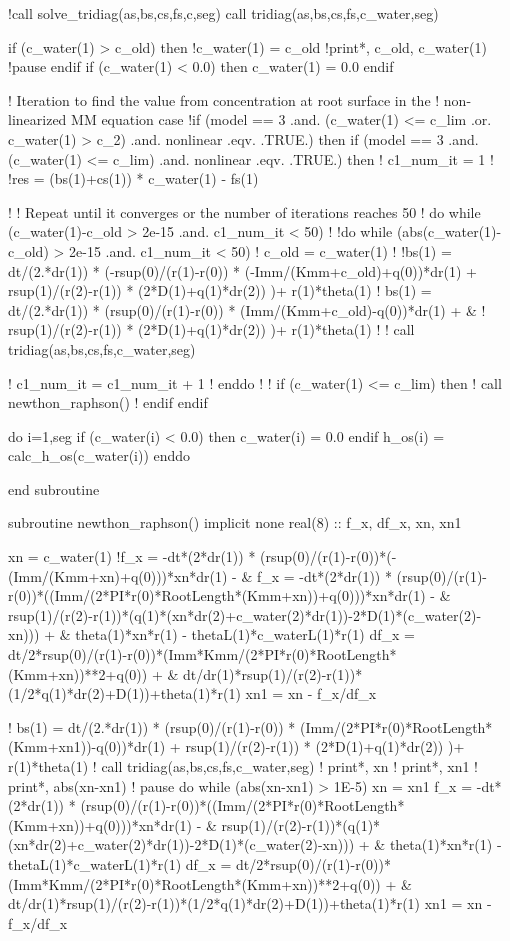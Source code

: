   !call solve_tridiag(as,bs,cs,fs,c,seg)
  call tridiag(as,bs,cs,fs,c_water,seg)
  
  if (c_water(1) > c_old) then
    !c_water(1) = c_old
    !print*, c_old, c_water(1)
    !pause
  endif
  if (c_water(1) < 0.0) then
    c_water(1) = 0.0
  endif

  ! Iteration to find the value from concentration at root surface in the
  ! non-linearized MM equation case
  !if (model == 3 .and. (c_water(1) <= c_lim .or. c_water(1) > c_2) .and. nonlinear .eqv. .TRUE.) then
  if (model == 3 .and. (c_water(1) <= c_lim) .and. nonlinear .eqv. .TRUE.) then
  !  c1_num_it = 1
  !  !res = (bs(1)+cs(1)) * c_water(1) - fs(1)

  !  ! Repeat until it converges or the number of iterations reaches 50
  !  do while (c_water(1)-c_old > 2e-15 .and. c1_num_it < 50) 
  !  !do while (abs(c_water(1)-c_old) > 2e-15 .and. c1_num_it < 50) 
  !    c_old = c_water(1)
  !    !bs(1) = dt/(2.*dr(1)) * (-rsup(0)/(r(1)-r(0)) * (-Imm/(Kmm+c_old)+q(0))*dr(1) + rsup(1)/(r(2)-r(1)) * (2*D(1)+q(1)*dr(2)) )+ r(1)*theta(1)
  !    bs(1) = dt/(2.*dr(1)) * (rsup(0)/(r(1)-r(0)) * (Imm/(Kmm+c_old)-q(0))*dr(1) + &
  !            rsup(1)/(r(2)-r(1)) * (2*D(1)+q(1)*dr(2)) )+ r(1)*theta(1) 
  !    
  !    call tridiag(as,bs,cs,fs,c_water,seg)

  !    c1_num_it = c1_num_it + 1
  !  enddo
  ! 
  ! if (c_water(1) <= c_lim) then 
  !   call newthon_raphson()
  ! endif
  endif
  
  do i=1,seg
    if (c_water(i) < 0.0) then
      c_water(i) = 0.0
    endif
    h_os(i) = calc_h_os(c_water(i))
  enddo

end subroutine

subroutine newthon_raphson()
implicit none
  real(8) :: f_x, df_x, xn, xn1

  xn = c_water(1)
  !f_x = -dt*(2*dr(1)) * (rsup(0)/(r(1)-r(0))*(-(Imm/(Kmm+xn)+q(0)))*xn*dr(1) - &
  f_x = -dt*(2*dr(1)) * (rsup(0)/(r(1)-r(0))*((Imm/(2*PI*r(0)*RootLength*(Kmm+xn))+q(0)))*xn*dr(1) - &
    rsup(1)/(r(2)-r(1))*(q(1)*(xn*dr(2)+c_water(2)*dr(1))-2*D(1)*(c_water(2)-xn))) + &
    theta(1)*xn*r(1) - thetaL(1)*c_waterL(1)*r(1)
  df_x = dt/2*rsup(0)/(r(1)-r(0))*(Imm*Kmm/(2*PI*r(0)*RootLength*(Kmm+xn))**2+q(0)) + &
    dt/dr(1)*rsup(1)/(r(2)-r(1))*(1/2*q(1)*dr(2)+D(1))+theta(1)*r(1)
  xn1 = xn - f_x/df_x

!  bs(1) = dt/(2.*dr(1)) * (rsup(0)/(r(1)-r(0)) * (Imm/(2*PI*r(0)*RootLength*(Kmm+xn1))-q(0))*dr(1) + rsup(1)/(r(2)-r(1)) * (2*D(1)+q(1)*dr(2)) )+ r(1)*theta(1) 
!  call tridiag(as,bs,cs,fs,c_water,seg)
!  print*, xn
!  print*, xn1
!  print*, abs(xn-xn1)
!  pause
  do while (abs(xn-xn1) > 1E-5)
    xn = xn1
    f_x = -dt*(2*dr(1)) * (rsup(0)/(r(1)-r(0))*((Imm/(2*PI*r(0)*RootLength*(Kmm+xn))+q(0)))*xn*dr(1) - &
      rsup(1)/(r(2)-r(1))*(q(1)*(xn*dr(2)+c_water(2)*dr(1))-2*D(1)*(c_water(2)-xn))) + &
      theta(1)*xn*r(1) - thetaL(1)*c_waterL(1)*r(1)
    df_x = dt/2*rsup(0)/(r(1)-r(0))*(Imm*Kmm/(2*PI*r(0)*RootLength*(Kmm+xn))**2+q(0)) + &
      dt/dr(1)*rsup(1)/(r(2)-r(1))*(1/2*q(1)*dr(2)+D(1))+theta(1)*r(1)
    xn1 = xn - f_x/df_x
    
